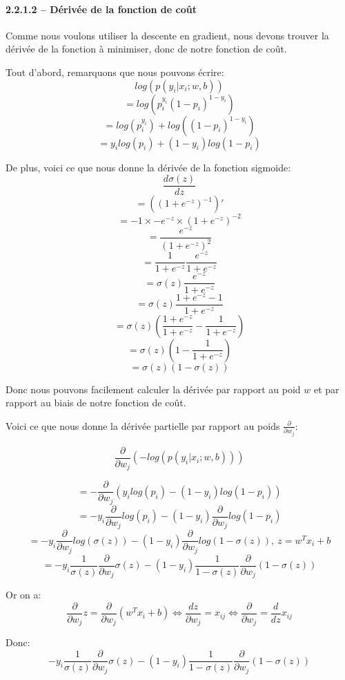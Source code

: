 \documentclass[
]{article}
\begin{document}
\paragraph{2.2.1.2 -- Dérivée de la fonction de
coût}\label{duxe9rivuxe9e-de-la-fonction-de-couxfbt}

Comme nous voulons utiliser la descente en gradient, nous devons trouver
la dérivée de la fonction à minimiser, donc de notre fonction de coût.

Tout d'abord, remarquons que nous pouvons écrire:
\[log(p(y_i|x_i; w, b))\] \[= log(p_i^{y_i}(1 - p_i)^{1 - y_i})\]
\[= log(p_i^{y_i}) + log((1 - p_i)^{1 - y_i})\]
\[= y_i log(p_i) + (1 - y_i)log(1 - p_i)\]

De plus, voici ce que nous donne la dérivée de la fonction sigmoide:
\[\frac{d\sigma(z)}{dz}\] \[= ((1 + e^{-z})^{-1})'\]
\[= -1 \times - e ^{-z} \times (1 + e^{-z})^{-2}\]
\[=\frac{e^{-z}}{(1 + e^{-z})^2}\]
\[=\frac{1}{1 + e^{-z}}\frac{e^{-z}}{1 + e^{-z}}\]
\[= \sigma (z) \frac{e^{-z}}{1 + e^{-z}}\]
\[= \sigma (z) \frac{1 + e^{-z} - 1}{1 + e^{-z}}\]
\[= \sigma (z) (\frac{1 + e^{-z}}{1 + e^{-z}} - \frac{1}{1 + e^{-z}})\]
\[= \sigma (z) (1 - \frac{1}{1 + e^{-z}})\]
\[= \sigma (z) (1 - \sigma (z))\]

Donc nous pouvons facilement calculer la dérivée par rapport au poid
\(w\) et par rapport au biais de notre fonction de coût.

Voici ce que nous donne la dérivée partielle par rapport au poids
\(\frac{\partial}{\partial w_j}\):

\[\frac{\partial}{\partial w_j}\left(-log(p(y_i|x_i;w,b))\right)\]

\[=-\frac{\partial}{\partial w_j} (y_i log(p_i) - (1 - y_i)log(1 - p_i))\]
\[=-y_i \frac{\partial}{\partial w_j}log(p_i) - (1 - y_i)\frac{\partial}{\partial w_j}log(1 - p_i)\]
\[=-y_i \frac{\partial}{\partial w_j}log(\sigma (z)) - (1 - y_i)\frac{\partial}{\partial w_j}log(1 - \sigma (z)),\ z = w^T x_i + b\]
\[=-y_i \frac{1}{\sigma (z)}\frac{\partial}{\partial w_j}\sigma (z) - (1 - y_i)\frac{1}{1 - \sigma (z)}\frac{\partial}{\partial w_j}(1 - \sigma (z))\]

Or on a:
\[\frac{\partial}{\partial w_j} z = \frac{\partial}{\partial w_j}(w^T x_i + b) \Leftrightarrow \frac{dz}{\partial w_j} = x_{ij} \Leftrightarrow \frac{\partial}{\partial w_j} = \frac{d}{dz}x_{ij}\]

Donc:
\[-y_i \frac{1}{\sigma (z)}\frac{\partial}{\partial w_j}\sigma (z) - (1 - y_i)\frac{1}{1 - \sigma (z)}\frac{\partial}{\partial w_j}(1 - \sigma (z))\]
\end{document}
